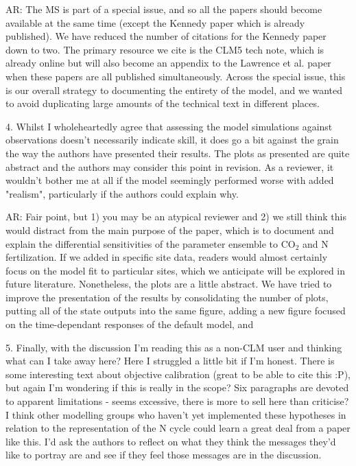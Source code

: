 \documentclass{article}
\begin{document}
\textsf{AR: The MS is part of a special issue, and so all the papers should become available at the same time (except the Kennedy paper which is already published). We have reduced the number of citations for the Kennedy paper down to two. The primary resource we cite is the CLM5 tech note, which is already online but will also become an appendix to the Lawrence et al. paper when these papers are all published simultaneously. Across the special issue, this is our overall strategy to documenting the entirety of the model, and we wanted to avoid duplicating large amounts of the technical text in different places.}

4. Whilst I wholeheartedly agree that assessing the model simulations against observations doesn't necessarily indicate skill, it does go a bit against the grain the way the authors have presented their results. The plots as presented are quite abstract and the authors may consider this point in revision. As a reviewer, it wouldn't bother me at all if the model seemingly performed worse with added "realism", particularly if the authors could explain why. 

\textsf{AR: Fair point, but 1) you may be an atypical reviewer and 2) we still think this would distract from the main purpose of the paper, which is to document and explain the differential sensitivities of the parameter ensemble to CO$_{2}$ and N fertilization. If we added in specific site data, readers would almost certainly focus on the model fit to particular sites, which we anticipate will be explored in future literature. Nonetheless, the plots are a little abstract. We have tried to improve the presentation of the results by consolidating the number of plots, putting all of the state outputs into the same figure, adding a new figure focused on the time-dependant responses of the default model, and }

5. Finally, with the discussion I'm reading this as a non-CLM user and thinking what can I take away here? Here I struggled a little bit if I'm honest. There is some interesting text about objective calibration (great to be able to cite this :P), but again I'm wondering if this is really in the scope? Six paragraphs are devoted to apparent limitations - seems excessive, there is more to sell here than criticise? I think other modelling groups who haven't yet implemented these hypotheses in relation to the representation of the N cycle could learn a great deal from a paper like this. I'd ask the authors to reflect on what they think the messages they'd like to portray are and see if they feel those messages are in the discussion. 
\end{document}
